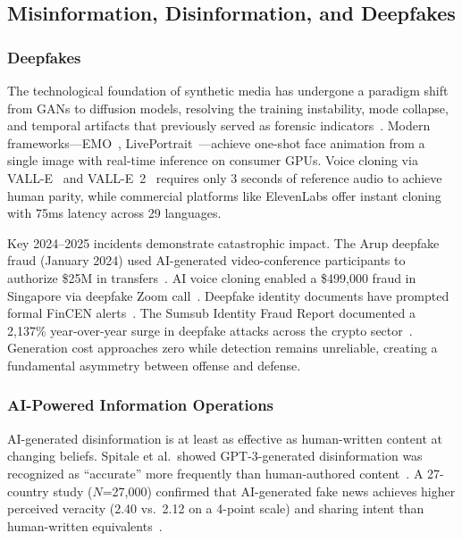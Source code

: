 \subsection{Misinformation, Disinformation, and Deepfakes}
\label{sec:threat-misinfo}

\subsubsection{Deepfakes}
\label{sec:threat-deepfake}

The technological foundation of synthetic media has undergone a paradigm shift from GANs to diffusion models, resolving the training instability, mode collapse, and temporal artifacts that previously served as forensic indicators~\cite{pei2024deepfakesurvey}. Modern frameworks---EMO~\cite{emo2024}, LivePortrait~\cite{liveportrait2024}---achieve one-shot face animation from a single image with real-time inference on consumer GPUs. Voice cloning via VALL-E~\cite{wang2023valle} and VALL-E~2~\cite{chen2024valle2} requires only 3 seconds of reference audio to achieve human parity, while commercial platforms like ElevenLabs offer instant cloning with 75ms latency across 29 languages.

Key 2024--2025 incidents demonstrate catastrophic impact. The Arup deepfake fraud (January 2024) used AI-generated video-conference participants to authorize \$25M in transfers~\cite{wef2025arup}. AI voice cloning enabled a \$499,000 fraud in Singapore via deepfake Zoom call~\cite{brightside2025phishing}. Deepfake identity documents have prompted formal FinCEN alerts~\cite{thomsonreuters2025fraud}. The Sumsub Identity Fraud Report documented a 2,137\% year-over-year surge in deepfake attacks across the crypto sector~\cite{sumsub2024}. Generation cost approaches zero while detection remains unreliable, creating a fundamental asymmetry between offense and defense.


\subsubsection{AI-Powered Information Operations}
\label{sec:threat-infoop}

AI-generated disinformation is at least as effective as human-written content at changing beliefs. Spitale et al.\ showed GPT-3-generated disinformation was recognized as ``accurate'' more frequently than human-authored content~\cite{spitale2023gpt3}. A 27-country study ($N$=27,000) confirmed that AI-generated fake news achieves higher perceived veracity (2.40 vs.\ 2.12 on a 4-point scale) and sharing intent than human-written equivalents~\cite{stefkovics2026fakenews}.


